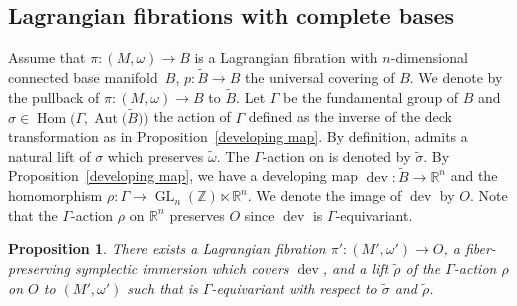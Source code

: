 \documentclass[pdftex]{sigma}
\numberwithin{equation}{section}
\newtheorem{Proposition}[Theorem]{Proposition}
 { \theoremstyle{definition}
\newtheorem{Definition}[Theorem]{Definition}
\newtheorem{Note}[Theorem]{Note}
\newtheorem{Example}[Theorem]{Example}
\newtheorem{Remark}[Theorem]{Remark} }
\newcommand{\R}{\mathbb{R}}
\newcommand{\Z}{\mathbb{Z}}
\renewcommand{\tilde}{\widetilde}
\def\dev{\operatorname{dev}}
\def\Aut{\operatorname{Aut}}
\def\Hom{\operatorname{Hom}}
\def\GL{\operatorname{GL}}
\begin{document}
\subsection{Lagrangian fibrations with complete bases}\label{complete bases}
Assume that $\pi \colon (M,\omega)\to B$ is a Lagrangian fibration with $n$-dimensional connected base mani\-fold~$B$, $p\colon \tilde B\to B$ the universal covering of $B$. We denote by \smash{$\tilde \pi\colon \bigl(\tilde M, \tilde \omega\bigr) \to \tilde B$} the pullback of $\pi\colon (M,\omega)\to B$ to $\tilde B$. Let $\Gamma$ be the fundamental group of $B$ and $\sigma \in \Hom\bigl( \Gamma ,\Aut\bigl(\tilde B\bigr)\bigr)$ the action of $\Gamma$ defined as the inverse of the deck transformation as in Proposition~\ref{developing map}. By definition, \smash{$\tilde M$} admits a natural lift of $\sigma$ which preserves $\tilde \omega$. The $\Gamma$-action on \smash{$\bigl(\tilde M, \tilde \omega\bigr)$} is denoted by $\tilde \sigma$. By Proposition~\ref{developing map}, we have a developing map $\dev\colon \tilde B\to \R^n$ and the homomorphism $\rho\colon \Gamma\to \GL_n(\Z)\ltimes \R^n$. We denote the image of $\dev$ by $O$. Note that the $\Gamma$-action $\rho$ on $\R^n$ preserves $O$ since $\dev$ is $\Gamma$-equivariant.
\begin{Proposition}\label{Lagrangian fibration on simply connected base}
There exists a Lagrangian fibration $\pi'\colon (M',\omega')\to O$, a fiber-preserving symplectic immersion \smash{$\tilde \dev \colon \bigl(\tilde M,\tilde \omega\bigr)\to (M',\omega')$} which covers $\dev$, and a lift $\tilde \rho$ of the $\Gamma$-action $\rho$ on $O$ to $(M',\omega')$ such that \smash{$\tilde \dev$} is $\Gamma$-equivariant with respect to $\tilde \sigma$ and $\tilde \rho$.
\end{Proposition}
\end{document}

